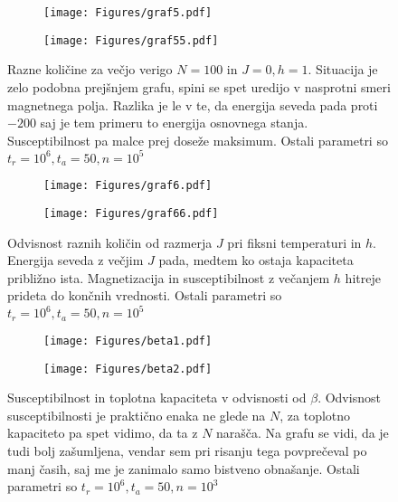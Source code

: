 \documentclass{article}
\begin{document}
\begin{figure}[H]
\centering
\begin{subfigure}{.49\textwidth}
\texttt{[image: Figures/graf5.pdf]}
\end{subfigure}
\begin{subfigure}{.49\textwidth}
\texttt{[image: Figures/graf55.pdf]}
\end{subfigure}
\caption*{Razne količine za večjo verigo $N=100$ in $J=0, h=1$.  Situacija je zelo podobna prejšnjem grafu, spini se spet uredijo v nasprotni smeri magnetnega polja. Razlika je le v te, da energija seveda pada proti $-200$ saj je tem primeru to energija osnovnega stanja. Susceptibilnost pa malce prej doseže maksimum. Ostali parametri so $t_r = 10^6, t_a = 50, n=10^5$}
\end{figure}

\begin{figure}[H]
\centering
\begin{subfigure}{.49\textwidth}
\texttt{[image: Figures/graf6.pdf]}
\end{subfigure}
\begin{subfigure}{.49\textwidth}
\texttt{[image: Figures/graf66.pdf]}
\end{subfigure}
\caption*{Odvisnost raznih količin od razmerja $J$ pri fiksni temperaturi in $h$. Energija seveda z večjim $J$ pada, medtem ko ostaja kapaciteta približno ista. Magnetizacija in susceptibilnost z večanjem $h$ hitreje prideta do končnih vrednosti.  Ostali parametri so $t_r = 10^6, t_a = 50, n=10^5$}
\end{figure}

\begin{figure}[H]
\centering
\begin{subfigure}{.49\textwidth}
\texttt{[image: Figures/beta1.pdf]}
\end{subfigure}
\begin{subfigure}{.49\textwidth}
\texttt{[image: Figures/beta2.pdf]}
\end{subfigure}
\caption*{Susceptibilnost in toplotna kapaciteta v odvisnosti od $\beta$. Odvisnost susceptibilnosti je praktično enaka ne glede na $N$, za toplotno kapaciteto pa spet vidimo, da ta z $N$ narašča. Na grafu se vidi, da je tudi bolj zašumljena, vendar sem pri risanju tega povprečeval po manj časih, saj me je zanimalo samo bistveno obnašanje. Ostali parametri so $t_r = 10^6, t_a = 50, n=10^3$}
\end{figure}
\end{document}
